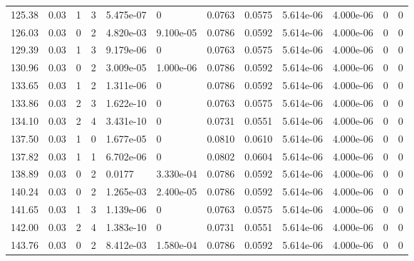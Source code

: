 \documentclass[preview]{standalone}
\begin{document}
{{{\begin{tabular}{L{1.2cm}C{1.2cm} C{0.3cm}C{0.5cm} C{1.4cm}C{1.4cm} C{1.4cm}C{1.4cm} C{1.6cm}C{1.6cm} C{1.6cm}C{1.6cm}}
  125.38  &  0.03  & 1     &  3 &  5.475e-07  & 0  &  0.0763&   0.0575& 5.614e-06 & 4.000e-06   &  0 & 0  \\ 
  126.03  &  0.03  & 0     &  2 &  4.820e-03  & 9.100e-05  &  0.0786&   0.0592& 5.614e-06 & 4.000e-06   &  0 & 0  \\ 
  129.39  &  0.03  & 1     &  3 &  9.179e-06  & 0  &  0.0763&   0.0575& 5.614e-06 & 4.000e-06   &  0 & 0  \\ 
  130.96  &  0.03  & 0     &  2 &  3.009e-05  & 1.000e-06  &  0.0786&   0.0592& 5.614e-06 & 4.000e-06   &  0 & 0  \\ 
  133.65  &  0.03  & 1     &  2 &  1.311e-06  & 0  &  0.0786&   0.0592& 5.614e-06 & 4.000e-06   &  0 & 0  \\ 
  133.86  &  0.03  & 2     &  3 &  1.622e-10  & 0  &  0.0763&   0.0575& 5.614e-06 & 4.000e-06   &  0 & 0  \\ 
  134.10  &  0.03  & 2     &  4 &  3.431e-10  & 0  &  0.0731&   0.0551& 5.614e-06 & 4.000e-06   &  0 & 0  \\ 
  137.50  &  0.03  & 1     &  0 &  1.677e-05  & 0  &  0.0810&   0.0610& 5.614e-06 & 4.000e-06   &  0 & 0  \\ 
  137.82  &  0.03  & 1     &  1 &  6.702e-06  & 0  &  0.0802&   0.0604& 5.614e-06 & 4.000e-06   &  0 & 0  \\ 
  138.89  &  0.03  & 0     &  2 &  0.0177  & 3.330e-04  &  0.0786&   0.0592& 5.614e-06 & 4.000e-06   &  0 & 0  \\ 
  140.24  &  0.03  & 0     &  2 &  1.265e-03  & 2.400e-05  &  0.0786&   0.0592& 5.614e-06 & 4.000e-06   &  0 & 0  \\ 
  141.65  &  0.03  & 1     &  3 &  1.139e-06  & 0  &  0.0763&   0.0575& 5.614e-06 & 4.000e-06   &  0 & 0  \\ 
  142.00  &  0.03  & 2     &  4 &  1.383e-10  & 0  &  0.0731&   0.0551& 5.614e-06 & 4.000e-06   &  0 & 0  \\ 
  143.76  &  0.03  & 0     &  2 &  8.412e-03  & 1.580e-04  &  0.0786&   0.0592& 5.614e-06 & 4.000e-06   &  0 & 0  \\ 
\hline 
\end{tabular} 

}}}
\end{document}
